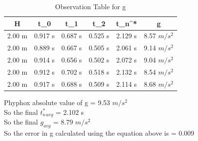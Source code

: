 \documentclass[11pt]{scrartcl} %
\begin{document}
\begin{table}[h]
\centering
\begin{tabular}{||c c c c c c||} 
\toprule
 \hline
 H & t_0 & t_1 & t_2 & t_n^* & g \\ [0.5ex] 
 \midrule
 \hline\hline
 2.00 m & 0.917 s & 0.687 s  & 0.525 s & 2.129 s & 8.57 $m/s^2$  \\ 
 \hline
 2.00 m & 0.889 s & 0.667 s & 0.505 s & 2.061 s & 9.14 $m/s^2$  \\
 \hline 
 2.00 m & 0.914 s & 0.656 s & 0.502 s & 2.072 s  & 9.04 $m/s^2$   \\
 \hline
 2.00 m & 0.912 s & 0.702 s & 0.518 s & 2.132 s  & 8.54 $m/s^2$   \\
 \hline
 2.00 m & 0.917 s & 0.688 s & 0.509 s & 2.114 s  & 8.68 $m/s^2$  \\ 
 [1ex]
 \bottomrule
 \hline
\end{tabular}
\caption{Observation Table for g}
\end{table}
Phyphox absolute value of g = 9.53 $m/s^2$\\
So the final $t_n^*_{avg}$ = 2.102 s\\
So the final $g_{avg}$ = 8.79 $m/s^2$\\
So the error in g calculated using the equation above is  = 0.009\\

\newpage
\end{document}
